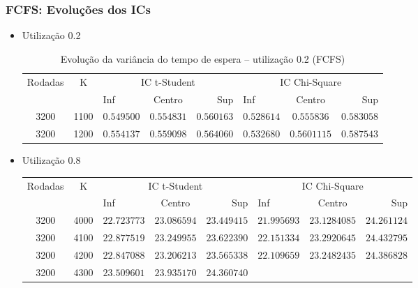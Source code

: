\documentclass[a4paper]{article}
\begin{document}
\subsubsection{FCFS: Evoluções dos ICs}
\begin{itemize}
    \item Utilização 0.2
    \begin{table}[h!]
        \centering
        \begin{tabular}{|c|c|lcr|lcr|}\hline
            \multirow{2}{3.75em}{Rodadas}
                & \multirow{2}{1em}{K}
                & \multicolumn{3}{|c|}{IC t-Student}
                & \multicolumn{3}{|c|}{IC Chi-Square} \\
            && Inf & Centro & Sup & Inf & Centro & Sup \\\hline
            3200 & 1100
                &$ 0.549500 $&$ 0.554831 $&$ 0.560163 $
                &$ 0.528614 $&$ 0.555836 $&$ 0.583058 $\\\hline
            3200 & 1200
                &$ 0.554137 $&$ 0.559098 $&$ 0.564060 $
                &$ 0.532680 $&$ 0.5601115 $&$ 0.587543 $\\\hline
        \end{tabular}
        \caption{Evolução da variância do tempo de espera --
            utilização 0.2 (FCFS)}
    \end{table}
    \item Utilização 0.8
    \begin{table}[h!]
        \centering
        \begin{tabular}{|c|c|lcr|lcr|}\hline
            \multirow{2}{3.75em}{Rodadas}
                & \multirow{2}{1em}{K}
                & \multicolumn{3}{|c|}{IC t-Student}
                & \multicolumn{3}{|c|}{IC Chi-Square} \\
            && Inf & Centro & Sup & Inf & Centro & Sup \\\hline
            3200 & 4000
                &$ 22.723773 $&$ 23.086594 $&$ 23.449415 $
                &$ 21.995693 $&$ 23.1284085 $&$ 24.261124 $\\\hline
            3200 & 4100
                &$ 22.877519 $&$ 23.249955 $&$ 23.622390 $
                &$ 22.151334 $&$ 23.2920645 $&$ 24.432795 $\\\hline
            3200 & 4200
                &$ 22.847088 $&$ 23.206213 $&$ 23.565338 $
                &$ 22.109659 $&$ 23.2482435 $&$ 24.386828 $\\\hline
            3200 & 4300
                &$ 23.509601 $&$ 23.935170 $&$ 24.360740 $

\end{tabular}
\end{table}
\end{itemize}
\end{document}
